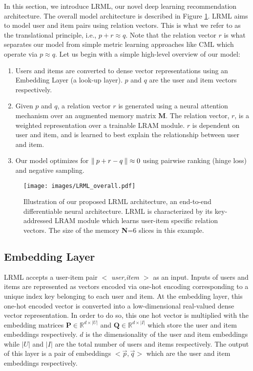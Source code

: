 \documentclass[sigconf]{acmart}
\DeclarePairedDelimiter\norm{\lVert}{\rVert}
\begin{document}
In this section, we introduce \textsc{LRML}, our novel deep learning recommendation architecture. The overall model architecture is described in Figure \ref{fig:transrec}. \textsc{LRML} aims to model user and item pairs using relation vectors. This is what we refer to as the translational principle, i.e., $p+r \approx q$. Note that the relation vector $r$ is what separates our model from simple metric learning approaches like CML which operate via $p \approx q$. Let us begin with a simple high-level overview of our model:
\begin{enumerate}
\item Users and items are converted to dense vector representations using an Embedding Layer (a look-up layer). $p$ and $q$ are the user and item vectors respectively. 
\item Given $p$ and $q$, a relation vector $r$ is generated using a neural attention mechanism over an augmented memory matrix $\textbf{M}$. The relation vector, $r$, is a weighted representation over a trainable LRAM module. $r$ is dependent on user and item, and is learned to best explain the relationship between user and item. 
\item Our model optimizes for $\norm{\: p+r-q \:} \approx 0$ using pairwise ranking (hinge loss) and negative sampling. 
\end{enumerate}

\begin{figure}[ht]
\begin{center}
\texttt{[image: images/LRML\_overall.pdf]}
\caption{Illustration of our proposed \textsc{LRML} architecture, an end-to-end differentiable neural architecture. LRML is characterized by its key-addressed LRAM module which learns user-item specific relation vectors. The size of the memory \textbf{N}=6 slices in this example.}
\label{fig:transrec}
\end{center}
\end{figure}


\subsection{Embedding Layer}
\textsc{LRML} accepts a user-item pair \emph{$<$ user,item $>$} as an input. Inputs of users and items are 
represented as vectors encoded via one-hot encoding corresponding to a unique index key belonging to each user and item. At the 
embedding layer, this one-hot encoded vector is converted into a low-dimensional real-valued dense vector representation. 
In order to do so, this one hot vector is multiplied with the embedding matrices $\textbf{P} \in \mathbb{R}^{d \times |U|}$
and $\textbf{Q} \in \mathbb{R}^{d \times |I|}$ which store the user and item embeddings respectively. $d$ is the dimensionality of
the user and item embeddings while $|U|$ and $|I|$ are the total number of users and items respectively. The output of this layer is a pair
of embeddings $<\vec{p},\vec{q}>$ which are the user and item embeddings respectively.   
\end{document}
